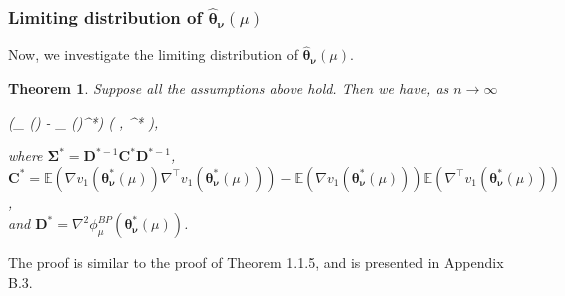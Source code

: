 \documentclass{article}
\newcommand{\wh}{\widehat}
\newcommand{\itl}{\intercal}
\newcommand{\bs}{ \boldsymbol}
\newcommand{\lt}{\left}
\newcommand{\rt}{\right}
\newtheorem{theorem}{Theorem}[section]
\begin{document}
\subsubsection{Limiting distribution of $\wh{\bs{\theta}}_{\bs{\nu}}(\mu)$}
Now, we investigate the limiting distribution of $\wh{\bs{\theta}}_{\bs{\nu}}(\mu)$.
\begin{theorem}
	Suppose all the assumptions above hold. Then we have, as $n\to \infty$
	\begin{flalign*}
	(\wh{\bs{\theta}}_{\bs{\nu}}(\mu) - \bs{\theta}_{\bs{\nu}}(\mu)^*)  \lt(\bs{0}, \bs{\Sigma}^* \rt),
	\end{flalign*}
	where $\bs{\Sigma}^* = \bs{D}^{*-1}\bs{C}^{*}\bs{D}^{*-1}$, \\
		$\bs{C}^* =\mathbb{E}\lt( \nabla v_1\lt(\bs{\theta}^*_{\bs{\nu}}(\mu)\rt)\nabla^{\itl} v_1\lt(\bs{\theta}^*_{\bs{\nu}}(\mu)\rt) \rt) - \mathbb{E}\lt(\nabla v_1\lt(\bs{\theta}^*_{\bs{\nu}}(\mu)\rt)\rt) \mathbb{E}\lt(\nabla^{\itl} v_1\lt(\bs{\theta}^*_{\bs{\nu}}(\mu)\rt)\rt)$,\\
	and $\bs{D}^*  =  \nabla^2 \phi^{BP}_{\mu}(\bs{\theta}^*_{\bs{\nu}}(\mu))$.
\end{theorem}
The proof is similar to the proof of Theorem 1.1.5, and is presented in Appendix B.3.
\end{document}
